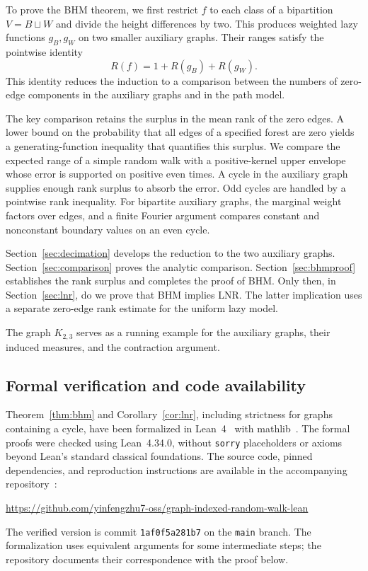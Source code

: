 \documentclass[11pt,reqno]{amsart}
\theoremstyle{remark}
\numberwithin{equation}{section}
\begin{document}
To prove the BHM theorem, we first restrict $f$ to each class of a bipartition
$V=B\sqcup W$ and divide the height differences by two. This produces
weighted lazy functions $g_B,g_W$ on two smaller auxiliary graphs.
Their ranges satisfy the pointwise identity
\[
 R(f)=1+R(g_B)+R(g_W).
\]
This identity reduces the induction to a comparison between the numbers
of zero-edge components in the auxiliary graphs and in the path model.

The key comparison retains the surplus in the mean rank of the zero
edges. A lower bound on the probability that all edges of a specified
forest are zero yields a generating-function inequality that quantifies
this surplus. We compare the expected range of a simple random walk
with a positive-kernel upper envelope whose error is supported on
positive even times. A cycle in the auxiliary graph supplies enough
rank surplus to absorb the error. Odd cycles are
handled by a pointwise rank inequality. For bipartite auxiliary graphs,
the marginal weight factors over edges, and a finite Fourier argument
compares constant and nonconstant boundary values on an even cycle.

Section~\ref{sec:decimation} develops the reduction to the two auxiliary
graphs. Section~\ref{sec:comparison} proves the analytic comparison.
Section~\ref{sec:bhmproof} establishes the rank surplus and completes
the proof of BHM. Only then, in Section~\ref{sec:lnr}, do we prove that
BHM implies LNR. The latter implication uses a separate zero-edge rank
estimate for the uniform lazy model.

The graph $K_{2,3}$ serves as a running example for the auxiliary
graphs, their induced measures, and the contraction argument.

\subsection*{Formal verification and code availability}
Theorem~\ref{thm:bhm} and Corollary~\ref{cor:lnr}, including strictness
for graphs containing a cycle, have been formalized in Lean~4~\cite{Lean4}
with mathlib~\cite{Mathlib}. The formal proofs were checked using
Lean~4.34.0, without \texttt{sorry} placeholders or axioms beyond Lean's
standard classical foundations. The source code, pinned dependencies,
and reproduction instructions are available in the accompanying
repository~\cite{GIRWLean}:
\begin{center}
\small\url{https://github.com/yinfengzhu7-oss/graph-indexed-random-walk-lean}
\end{center}
The verified version is commit
\texttt{1af0f5a281b7} on the \texttt{main} branch. The formalization
uses equivalent arguments for some intermediate steps; the repository
documents their correspondence with the proof below.
\end{document}
